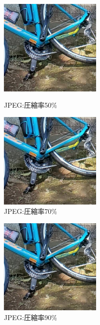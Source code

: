 \documentclass[a4paper,11pt]{bxjsarticle}
\begin{document}
   \begin{figure}[htbp]
    \begin{minipage}{0.5\hsize}
     \begin{center}
      \includegraphics[width=50mm]{sample_j50.jpg}
     \end{center}
     \caption{JPEG:圧縮率50\%}
     \label{fig:j50}
    \end{minipage}
    \begin{minipage}{0.5\hsize}
     \begin{center}
      \includegraphics[width=50mm]{sample_j70.jpg}
     \end{center}
     \caption{JPEG:圧縮率70\%}
     \label{fig:j70}
    \end{minipage}
   \end{figure}
\newpage
   \begin{figure}[htbp]
     \begin{center}
      \includegraphics[width=50mm]{sample_j90.jpg}
     \end{center}
     \caption{JPEG:圧縮率90\%}
     \label{fig:j90}
   \end{figure}
\end{document}
